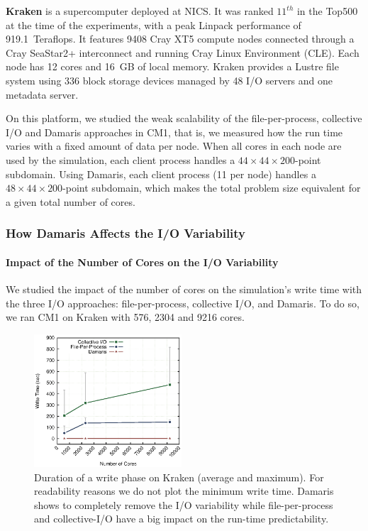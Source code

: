 \begin{description}
\item{\textbf{Kraken}} is a supercomputer deployed at NICS. It was ranked $11^{th}$ in the 
Top500~\cite{top500} at the time of the experiments, with a peak Linpack performance of 919.1~Teraflops.
It features 9408 Cray XT5 compute nodes connected through a Cray 
SeaStar2+ interconnect and running Cray Linux Environment (CLE). 
Each node has 12 cores and 16~GB of local memory.
Kraken provides a Lustre file system using 336 block storage devices managed
by 48 I/O servers and one metadata server.

On this platform, we studied the weak scalability of the file-per-process,
collective I/O and Damaris approaches in CM1,
that is, we measured how the run time varies with a fixed amount of data per node.
When all cores in each node are used by the simulation, each client process handles a 
$44\times44\times200$-point subdomain.
Using Damaris, each client process (11 per node) 
handles a $48\times44\times200$-point subdomain, which makes the total problem 
size equivalent for a given total number of cores.

\end{description}

\subsubsection{How Damaris Affects the I/O Variability}

\paragraph{Impact of the Number of Cores on the I/O Variability}
We studied the impact of the number of cores on the simulation's write time
with the three I/O approaches: file-per-process, collective I/O, and
Damaris. To do so, we ran CM1 on Kraken with 576, 2304 and 9216 cores.

\begin{figure}
	\includegraphics[width=5.5cm]{figures/kraken-write-time.eps}
	\caption[Write time of CM1 on Kraken]{Duration of a write phase on Kraken (average and maximum).
	For readability reasons we do not plot the minimum write time.
	Damaris shows to completely remove the I/O variability while file-per-process and 
	collective-I/O have a big impact on the run-time predictability.}
	\label{fig:kraken_write_time}
\end{figure}

